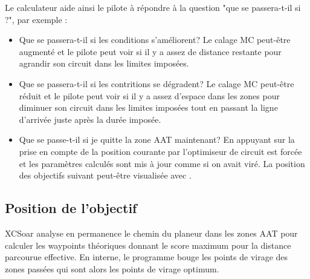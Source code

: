 Le calculateur aide ainsi le pilote à répondre à la question "que se passera-t-il si ?", par exemple :
\begin{itemize}
\item Que se passera-t-il si les conditions s'améliorent? Le calage MC peut-être augmenté et le pilote peut voir si il y a assez de distance restante pour agrandir son circuit dans les limites imposées.
\item Que se passera-t-il si les contritions se dégradent? Le calage MC peut-être réduit et le pilote peut voir si il y a assez d'espace dans les zones pour diminuer son circuit dans les limites imposées tout en passant la ligne d'arrivée juste après la durée imposée.
\item Que se passe-t-il si je quitte la zone AAT maintenant? En appuyant sur  la prise en compte de la position courante par l'optimiseur de circuit est forcée et les paramètres calculés sont mis à jour comme si on avait viré. La position des objectifs suivant peut-être visualisée avec .
\end{itemize}

\subsection*{Position de l'objectif}

XCSoar analyse en permanence le chemin du planeur dans les zones AAT pour calculer les waypoints théoriques donnant le score maximum pour la distance parcourue effective. En interne, le programme bouge les points de virage des zones passées qui sont alors les points de virage optimum.


